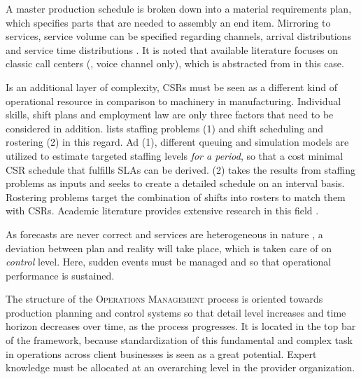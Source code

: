 	A master production schedule is broken down into a material requirements plan, which specifies parts that are needed to assembly an end item. Mirroring to services, service volume can be specified regarding channels, arrival distributions and service time distributions \citep{Aksin_2009}. It is noted that available literature focuses on classic call centers (\ie, voice channel only), which is abstracted from in this case. 
	
	Is an additional layer of complexity, \acrshort{CSR}s must be seen as a different kind of operational resource in comparison to machinery in manufacturing. Individual skills, shift plans and employment law are only three factors that need to be considered in addition. \cite{Aksin_2009} lists staffing problems (1) and shift scheduling and rostering (2) in this regard. Ad (1), different queuing and simulation models are utilized to estimate targeted staffing levels \textit{for a period}, so that a cost minimal \acrshort{CSR} schedule that fulfills \acrshort{SLA}s can be derived. 
	(2) takes the results from staffing problems as inputs and seeks to create a detailed schedule on an interval basis. Rostering problems target the combination of shifts into rosters to match them with \acrshort{CSR}s. Academic literature provides extensive research in this field \citep{Gans_2003, Ernst_2004}. 
	
	As forecasts are never correct and services are heterogeneous in nature \citep{cowell}, a deviation between plan and reality will take place, which is taken care of on \textit{control} level. Here, sudden events must be managed and so that operational performance is sustained. 
	
	The structure of the \textsc{Operations Management} process is oriented towards production planning and control systems \citep{9780130176158} so that detail level increases and time horizon decreases over time, \viz as the process progresses. It is located in the top bar of the framework, because standardization of this fundamental and complex task in operations across client businesses is seen as a great potential. Expert knowledge must be allocated at an overarching level in the provider organization.  
	
